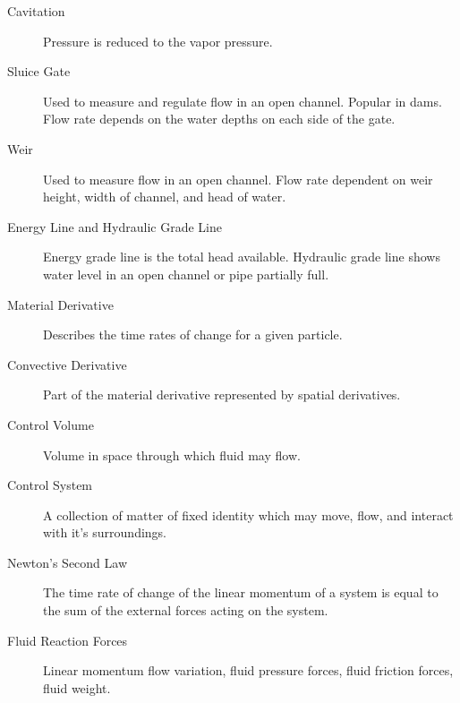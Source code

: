\documentclass{article}
\begin{document}
\begin{description}
    \item[Cavitation] Pressure is reduced to the vapor pressure.
    \item[Sluice Gate] Used to measure and regulate flow in an open channel. Popular in dams. Flow rate depends on the water depths on each side of the gate.
    \item[Weir] Used to measure flow in an open channel. Flow rate dependent on weir height, width of channel, and head of water.
    \item[Energy Line and Hydraulic Grade Line] Energy grade line is the total head available. Hydraulic grade line shows water level in an open channel or pipe partially full.
    \item[Material Derivative] Describes the time rates of change for a given particle.
    \item[Convective Derivative] Part of the material derivative represented by spatial derivatives.
    \item[Control Volume] Volume in space through which fluid may flow.
    \item[Control System] A collection of matter of fixed identity which may move, flow, and interact with it's surroundings.
    \item[Newton's Second Law] The time rate of change of the linear momentum of a system is equal to the sum of the external forces acting on the system.
    \item[Fluid Reaction Forces] Linear momentum flow variation, fluid pressure forces, fluid friction forces, fluid weight.
\end{description}
\end{document}
